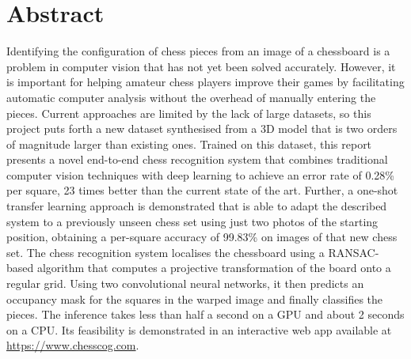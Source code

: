 \documentclass[../main.tex]{subfiles}
\begin{document}
\chapter*{Abstract}

Identifying the configuration of chess pieces from an image of a chessboard is a problem in computer vision that has not yet been solved accurately.
However, it is important for helping amateur chess players improve their games by facilitating automatic computer analysis without the overhead of manually entering the pieces.
Current approaches are limited by the lack of large datasets, so this project puts forth a new dataset synthesised from a 3D model that is two orders of magnitude larger than existing ones.
Trained on this dataset, this report presents a novel end-to-end chess recognition system that combines traditional computer vision techniques with deep learning to achieve an error rate of 0.28\% per square, 23 times better than the current state of the art.
Further, a one-shot transfer learning approach is demonstrated that is able to adapt the described system to a previously unseen chess set using just two photos of the starting position, obtaining a per-square accuracy of 99.83\% on images of that new chess set.
The chess recognition system localises the chessboard using a RANSAC-based algorithm that computes a projective transformation of the board onto a regular grid.
Using two convolutional neural networks, it then predicts an occupancy mask for the squares in the warped image and finally classifies the pieces.
The inference takes less than half a second on a GPU and about 2 seconds on a CPU.
Its feasibility is demonstrated in an interactive web app available at \url{https://www.chesscog.com}.
\end{document}
